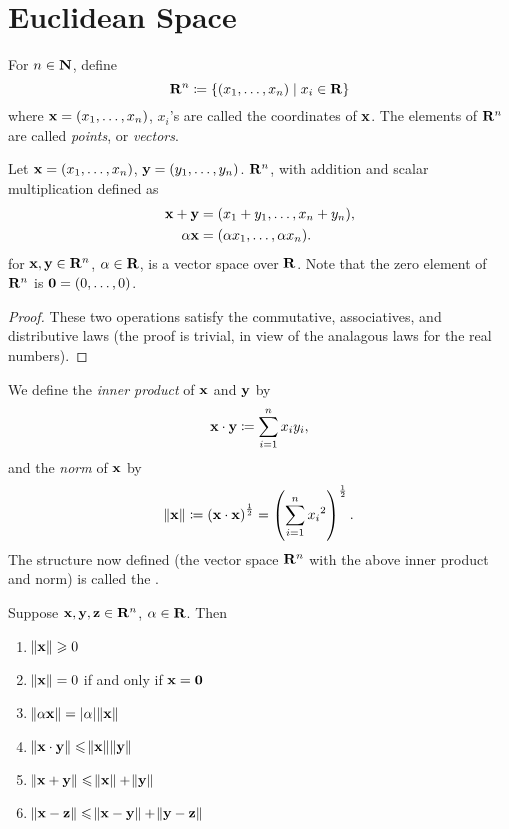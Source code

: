 \section{Euclidean Space}
For $n\in\mathbf N$, define
\[\mathbf R^n\coloneqq\{(x_1,\dots,x_n)\mid x_i\in\mathbf R\}\]
where $\vb{x}=(x_1,\dots,x_n)$, $x_i$'s are called the coordinates of $\vb{x}$. The elements of $\mathbf R^n$ are called \emph{points}, or \emph{vectors}.

\begin{proposition}
Let $\vb{x}=(x_1,\dots,x_n)$, $\vb{y}=(y_1,\dots,y_n)$. $\mathbf R^n$, with addition and scalar multiplication defined as
\begin{align*}
\vb{x}+\vb{y}&=(x_1+y_1,\dots,x_n+y_n),\\
\alpha\vb{x}&=(\alpha x_1,\dots,\alpha x_n).
\end{align*}
for $\vb{x},\vb{y}\in\mathbf R^n$, $\alpha\in\mathbf R$, is a vector space over $\mathbf R$. Note that the zero element of $\mathbf R^n$ is $\vb{0}=(0,\dots,0)$.
\end{proposition}

\begin{proof}
These two operations satisfy the commutative, associatives, and distributive laws (the proof is trivial, in view of the analagous laws for the real numbers).
\end{proof}

We define the \emph{inner product} of $\vb{x}$ and $\vb{y}$ by
\[\vb{x}\cdot\vb{y}\coloneqq\sum_{i=1}^nx_iy_i,\]
and the \emph{norm} of $\vb{x}$ by
\[\norm{\vb{x}}\coloneqq\left(\vb{x}\cdot\vb{x}\right)^\frac{1}{2}=\left(\sum_{i=1}^n{x_i}^2\right)^\frac{1}{2}.\]
The structure now defined (the vector space $\mathbf R^n$ with the above inner product and norm) is called the .

\begin{proposition}
Suppose $\vb{x},\vb{y},\vb{z}\in\mathbf R^n$, $\alpha\in\mathbf R$. Then
\begin{enumerate}[label=(\roman*)]
\item $\norm{\vb{x}}\geqslant0$
\item $\norm{\vb{x}}=0$ if and only if $\vb{x}=\vb{0}$
\item $\norm{\alpha\vb{x}}=|\alpha|\norm{\vb{x}}$
\item $\norm{\vb{x}\cdot\vb{y}}\leqslant\norm{\vb{x}}\norm{\vb{y}}$
\item $\norm{\vb{x}+\vb{y}}\leqslant\norm{\vb{x}}+\norm{\vb{y}}$
\item $\norm{\vb{x}-\vb{z}}\leqslant\norm{\vb{x}-\vb{y}}+\norm{\vb{y}-\vb{z}}$
\end{enumerate}
\end{proposition}

